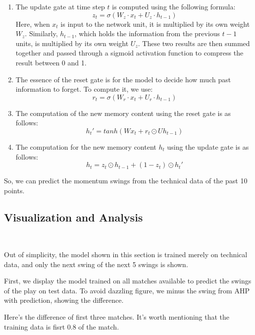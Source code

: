 \begin{enumerate}
    \item 
    The update gate at time step $t$ is computed using the following formula:  
    $$  z_t = \sigma(W_z \cdot x_t + U_z \cdot h_{t-1})  $$  
    Here, when $x_t$ is input to the network unit, 
    it is multiplied by its own weight $W_z$. 
    Similarly, $h_{t-1}$, which holds the information from the previous $t-1$ units, 
    is multiplied by its own weight $U_z$. These two results are then summed together 
    and passed through a sigmoid activation function to compress the result between 0 and 1. 
  
    \item 
    The essence of the reset gate is for the model to decide how much past information to forget. To compute it, we use:  
    $$  r_t = \sigma(W_r \cdot x_t + U_r \cdot h_{t-1})  $$  

    \item 
    The computation of the new memory content using the reset gate is as follows:  
    $$ h_t'= tanh(Wx_t+r_t\odot Uh_{t-1})$$

    \item 
    The computation for the new memory content $h_t$ using the update gate is as follows:  
    $$ h_t=z_t\odot h_{t-1}+(1-z_t)\odot h_t'$$ 
\end{enumerate}

So, we can predict the momentum swings from the technical data of the past 10 points.

\subsection{Visualization and Analysis}~{}

Out of simplicity, the model shown in this section is trained merely on technical data,
and only the next swing of the next 5 swings is shown.

First, we display the model trained on all matches available to 
predict the swings of the play on test data.
To avoid dazzling figure, we minus the swing from AHP with prediction, showing the difference.

Here's the difference of first three matches. It's worth mentioning that the training data
is fisrt 0.8 of the match.

